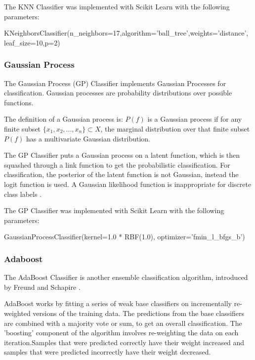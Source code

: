 The KNN Classifier was implemented with Scikit Learn with the following parameters:

\begin{tcolorbox}
\begin{center}
	KNeighborsClassifier(n\_neighbors=17,algorithm='ball\_tree',weights='distance',
	leaf\_size=10,p=2)
\end{center}
\end{tcolorbox}

\subsubsection*{Gaussian Process}

The Gaussian Process (GP) Classifier implements Gaussian Processes for classification. Gaussian processes are probability distributions over possible functions.

The definition of a Gaussian process is: $P(f)$ is a Gaussian process if for any finite subset $\{x_1,x_2,...,x_n\} \subset X$, the marginal distribution over that finite subset $P(f)$ has a multivariate Gaussian distribution.

The GP Classifier puts a Gaussian process on a latent function, which is then squashed through a link function to get the probabilistic classification. For classification, the posterior of the latent function is not Gaussian, instead the logit function is used. A Gaussian likelihood function is inappropriate for discrete class labels \cite{gaussianProcesses2006}.

The GP Classifier was implemented with Scikit Learn with the following parameters:

\begin{tcolorbox}
\begin{center}
	GaussianProcessClassifier(kernel=1.0 * RBF(1.0), optimizer='fmin\_l\_bfgs\_b')
\end{center}
\end{tcolorbox}

\subsubsection*{Adaboost}

The AdaBoost Classifier is another ensemble classification algorithm, introduced by Freund and Schapire \cite{adaboost1997}.

AdaBoost works by fitting a series of weak base classifiers on incrementally re-weighted versions of the training data. The predictions from the base classifiers are combined with a majority vote or sum, to get an overall classification. The 'boosting' component of the algorithm involves re-weighting the data on each iteration.Samples that were predicted correctly have their weight increased and samples that were predicted incorrectly have their weight decreased.

